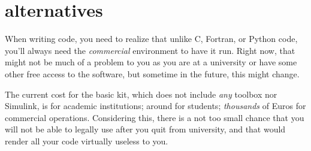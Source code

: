%
% 
% 
% 
%
\newpage
\section*{{\matlab} alternatives}

When writing {\matlab} code, you need to realize that unlike C, Fortran, or Python code, you'll always need the \emph{commercial} {\matlab} environment to have it run. Right now, that might not be much of a problem to you as you are at a university or have some other free access to the software, but sometime in the future, this might change.

The current cost for the basic {\matlab} kit, which does not include \emph{any} toolbox nor Simulink, is  for academic institutions; around  for students; \emph{thousands} of Euros for commercial operations. Considering this, there is a not too small chance that you will not be able to legally use {\matlab} after you quit from university, and that would render all your code virtually useless to you.

